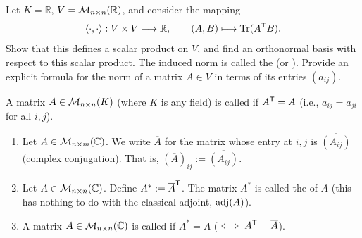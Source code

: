 \begin{exercise}
  \label{exc:frobenius_hilbert_schmidt_inner_product}
  Let $K = \mathbb{R}$, $V = \mathcal{M}_{n \times n}(\mathbb{R})$, and consider the mapping
  \[
  \langle \cdot, \cdot \rangle : V \times V \longrightarrow \mathbb{R}, \qquad (A, B) \longmapsto \operatorname{Tr}(A^{\mathsf{T}} B).
  \]
  Show that this defines a scalar product on $V$, and find an orthonormal basis with respect to this scalar product. The induced norm is called the  (or ). Provide an explicit formula for the norm of a matrix $A \in V$ in terms of its entries $(a_{ij})$.
\end{exercise}

\begin{definition}
\label{def:symmetric_matrix}
    A matrix $A \in \mathcal{M}_{n \times n}(K)$ (where $K$ is any field) is called  if $A^{\mathsf{T}} = A$ (i.e., $a_{ij} = a_{ji}$ for all $i,j$).
\end{definition}

\begin{definition}
\label{def:adjoint_hermitian_matrices}
    \begin{enumerate}[label=\textbf{(\alph*)}]
        \item Let $A \in \mathcal{M}_{n \times m}(\mathbb{C})$. We write $\overline{A}$ for the matrix whose entry at $i,j$ is $\overline{(A_{ij})}$ (complex conjugation). That is, $(\overline{A})_{ij} := \overline{(A_{ij})}$.
        \item Let $A \in \mathcal{M}_{n \times n}(\mathbb{C})$. Define $A^* := \overline{A}^{\mathsf{T}}$. The matrix $A^*$ is called the  of $A$ (this has nothing to do with the classical adjoint, $\operatorname{adj}(A)$).
        \item A matrix $A \in \mathcal{M}_{n \times n}(\mathbb{C})$ is called  if $A^* = A$ ($\iff A^{\mathsf{T}} = \overline{A}$).
    \end{enumerate}
\end{definition}

